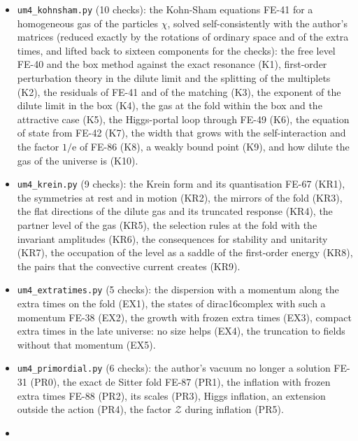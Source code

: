 \documentclass[
  10pt,
]{article}
\begin{document}
\begin{itemize}
  \texttt{um4\_spectra.py} (8 checks): the reduction to eight copies
  (U1), the exact solutions FE-85 (U2), the resonances FE-40 with the
  \(16 \times 16\) matching (U3), their widths FE-86 (U4), their
  dispersion (U5), the lifetime condition (U6), their Krein form (U7)
  and their mirror (U8).
\item
  \texttt{um4\_kohnsham.py} (10 checks): the Kohn-Sham equations FE-41
  for a homogeneous gas of the particles \(\chi\), solved
  self-consistently with the author's matrices (reduced exactly by the
  rotations of ordinary space and of the extra times, and lifted back to
  sixteen components for the checks): the free level FE-40 and the box
  method against the exact resonance (K1), first-order perturbation
  theory in the dilute limit and the splitting of the multiplets (K2),
  the residuals of FE-41 and of the matching (K3), the exponent of the
  dilute limit in the box (K4), the gas at the fold within the box and
  the attractive case (K5), the Higgs-portal loop through FE-49 (K6),
  the equation of state from FE-42 (K7), the width that grows with the
  self-interaction and the factor \(1/\mathrm{e}\) of FE-86 (K8), a
  weakly bound point (K9), and how dilute the gas of the universe is
  (K10).
\item
  \texttt{um4\_krein.py} (9 checks): the Krein form and its quantisation
  FE-67 (KR1), the symmetries at rest and in motion (KR2), the mirrors
  of the fold (KR3), the flat directions of the dilute gas and its
  truncated response (KR4), the partner level of the gas (KR5), the
  selection rules at the fold with the invariant amplitudes (KR6), the
  consequences for stability and unitarity (KR7), the occupation of the
  level as a saddle of the first-order energy (KR8), the pairs that the
  convective current creates (KR9).
\item
  \texttt{um4\_extratimes.py} (5 checks): the dispersion with a momentum
  along the extra times on the fold (EX1), the states of dirac16complex
  with such a momentum FE-38 (EX2), the growth with frozen extra times
  (EX3), compact extra times in the late universe: no size helps (EX4),
  the truncation to fields without that momentum (EX5).
\item
  \texttt{um4\_primordial.py} (6 checks): the author's vacuum no longer
  a solution FE-31 (PR0), the exact de Sitter fold FE-87 (PR1), the
  inflation with frozen extra times FE-88 (PR2), its scales (PR3), Higgs
  inflation, an extension outside the action (PR4), the factor
  \(\mathcal{Z}\) during inflation (PR5).
\item

\end{itemize}
\end{document}
